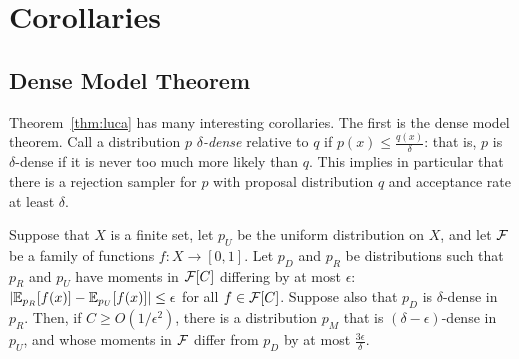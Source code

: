 \documentclass[11pt]{article}
\begin{document}

\section{Corollaries}
\subsection{Dense Model Theorem}
Theorem~\ref{thm:luca} has many interesting corollaries. The first is the dense model theorem. Call 
a distribution $p$ \emph{$\delta$-dense} relative to $q$ if $p(x) \leq \frac{q(x)}{\delta}$: that is, 
$p$ is $\delta$-dense if it is never too much more likely than $q$. This implies in particular that 
there is a rejection sampler for $p$ with proposal distribution $q$ and acceptance rate at least $\delta$.

\begin{theorem}
Suppose that $X$ is a finite set, let $p_U$ be the uniform distribution 
on $X$, and let $\mathcal{F}$ be a family of functions $f : X \to [0,1]$. 
Let $p_D$ and $p_R$ be distributions such that $p_R$ and $p_U$ have moments in $\mathcal{F}[C]$ differing 
by at most $\epsilon$: $|\mathbb{E}_{p_R}[f(x)]-\mathbb{E}_{p_U}[f(x)]| \leq \epsilon$ for all $f \in \mathcal{F}[C]$.
Suppose also that $p_D$ is $\delta$-dense in $p_R$. Then, if $C \geq O(1/\epsilon^2)$, 
there is a distribution $p_M$ that is $(\delta-\epsilon)$-dense in $p_U$, and whose moments in $\mathcal{F}$ 
differ from $p_D$ by at most $\frac{3\epsilon}{\delta}$.
\end{theorem}
\end{document}
